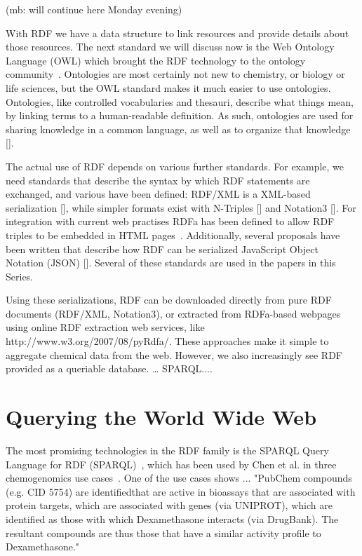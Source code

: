 \documentclass[10pt]{bmc_article}
\newenvironment{bmcformat}{\begin{raggedright}\baselineskip20pt\sloppy\setboolean{publ}{false}}{\end{raggedright}\baselineskip20pt\sloppy}
\begin{document}
\begin{bmcformat}
(mb: will continue here Monday evening)

With RDF we have a data structure to link resources and provide details about
those resources. The next standard we will discuss now is the Web Ontology
Language (OWL) which brought the RDF technology to the ontology community~\cite{GUN2004}.
Ontologies are most certainly not new to chemistry, or biology or life sciences,
but the OWL standard makes it much easier to use ontologies. Ontologies, like
controlled vocabularies and thesauri, describe what things mean, by linking
terms to a human-readable definition. As such, ontologies are used for sharing
knowledge in a common language, as well as to organize that knowledge []. 

The actual use of RDF depends on various further standards. For example, we need
standards that describe the syntax by which RDF statements are exchanged, and
various have been defined: RDF/XML is a XML-based serialization [], while
simpler formats exist with N-Triples [] and Notation3 []. For integration with
current web practises RDFa has been defined to allow RDF triples to be embedded
in HTML pages~\cite{RDFA2008}. Additionally, several proposals have been written that
describe how RDF can be serialized JavaScript Object Notation (JSON) []. Several
of these standards are used in the papers in this Series.

Using these serializations, RDF can be downloaded directly from pure RDF
documents (RDF/XML, Notation3), or extracted from RDFa-based webpages using
online RDF extraction web services, like http://www.w3.org/2007/08/pyRdfa/.
These approaches make it simple to aggregate chemical data from the web.
However, we also increasingly see RDF provided as a queriable database. …
SPARQL....


\section{Querying the World Wide Web}

The most promising technologies in the RDF family is the
SPARQL Query Language for RDF (SPARQL)~\cite{PrudHommeaux2008}, which has been
used by Chen et al. in three chemogenomics use cases~\cite{CHE2010}. 
One of the use cases shows ... "PubChem compounds (e.g. CID 5754) are identifiedthat are active in bioassays that are associated with protein targets, which are associated with genes (via UNIPROT), which are identified as those with which Dexamethasone interacts (via DrugBank). The resultant compounds are thus those that have a similar activity profile to Dexamethasone."


\end{bmcformat}
\end{document}
